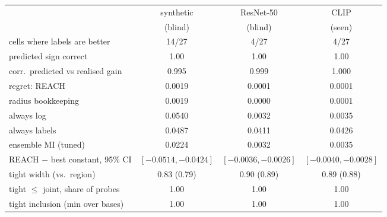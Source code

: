 \begin{tabular}{lccc}
\toprule
 & synthetic & ResNet-50 & CLIP \\
 & (blind) & (blind) & (seen) \\
\midrule
cells where labels are better & 14/27 & 4/27 & 4/27 \\
predicted sign correct & 1.00 & 1.00 & 1.00 \\
corr.\ predicted vs realised gain & 0.995 & 0.999 & 1.000 \\
\midrule
regret: REACH & 0.0019 & 0.0001 & 0.0001 \\
\quad radius bookkeeping & 0.0019 & 0.0000 & 0.0001 \\
\quad always log & 0.0540 & 0.0032 & 0.0035 \\
\quad always labels & 0.0487 & 0.0411 & 0.0426 \\
\quad ensemble MI (tuned) & 0.0224 & 0.0032 & 0.0035 \\
REACH $-$ best constant, 95\% CI & $[-0.0514,-0.0424]$ & $[-0.0036,-0.0026]$ & $[-0.0040,-0.0028]$ \\
\midrule
tight width (vs.\ region) & 0.83 (0.79) & 0.90 (0.89) & 0.89 (0.88) \\
tight $\le$ joint, share of probes & 1.00 & 1.00 & 1.00 \\
tight inclusion (min over bases) & 1.00 & 1.00 & 1.00 \\
\bottomrule
\end{tabular}
